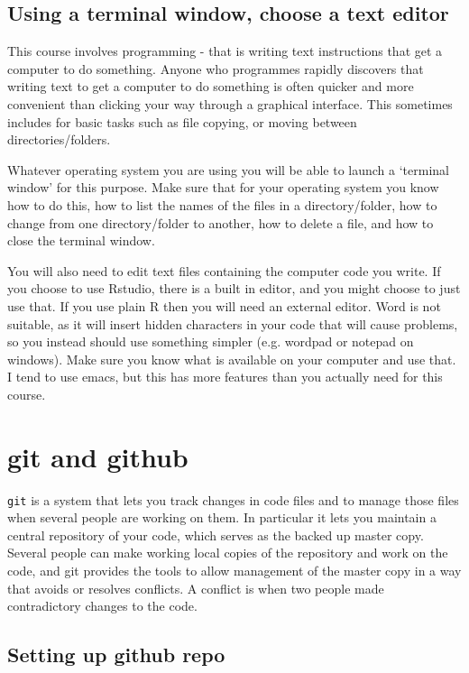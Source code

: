 \documentclass[10pt] {article}
\theoremstyle{definition}
\begin{document}
\subsection{Using a terminal window, choose a text editor}

This course involves programming - that is writing text instructions that get a computer to do something. Anyone who programmes rapidly discovers that writing text to get a computer to do something is often quicker and more convenient than clicking your way through a graphical interface. This sometimes includes for basic tasks such as file copying, or moving between directories/folders. 

Whatever operating system you are using you will be able to launch a `terminal window' for this purpose. Make sure that for your operating system you know how to do this, how to list the names of the files in a directory/folder, how to change from one directory/folder to another, how to delete a file, and how to close the terminal window. 

You will also need to edit text files containing the computer code you write. If you choose to use Rstudio, there is a built in editor, and you might choose to just use that. If you use plain R then you will need an external editor. Word is not suitable, as it will insert hidden characters in your code that will cause problems, so you instead should use something simpler (e.g. wordpad or notepad on windows). Make sure you know what is available on your computer and use that. I tend to use emacs, but this has more features than you actually need for this course. 

\section{git and github}

{\tt git} is a system that lets you track changes in code files and to manage those files when several people are working on them. In particular it lets you maintain a central repository of your code, which serves as the backed up master copy. Several people can make working local copies of the repository and work on the code, and git provides the tools to allow management of the master copy in a way that avoids or resolves conflicts. A conflict is when two people made contradictory changes to the code.  

\subsection{Setting up github repo}
\end{document}
